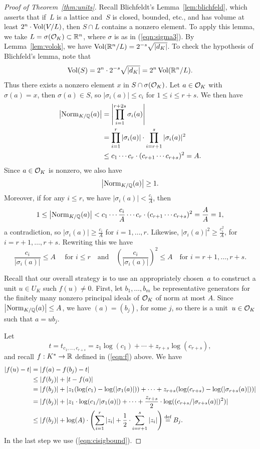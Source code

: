\begin{proof}[Proof of Theorem~\ref{thm:units}]
Recall Blichfeldt's Lemma~\ref{lem:blichfeld}, which asserts
that if~$L$ is a lattice and~$S$ is closed,
bounded, etc., and has volume at least $2^n\cdot \operatorname{Vol}(V/L)$, then
$S\cap L$ contains a nonzero element.   To apply this lemma, we
take $L=\sigma(\mathcal{O}_K)\subset \mathbb{R}^n$, where $\sigma$ is as in (\ref{eqn:sigma3}).
By Lemma~\ref{lem:volok},
we have
$\operatorname{Vol}(\mathbb{R}^n/L) = 2^{-s}\sqrt{|d_K|}$.  To check the hypothesis
of Blichfeld's lemma, note that
$$
 \operatorname{Vol}(S) = 2^n \cdot 2^{-s} \sqrt{|d_K|} = 2^n \operatorname{Vol}(\mathbb{R}^n/L).
$$
Thus there exists a nonzero element $x$ in $S\cap \sigma(\mathcal{O}_K)$.
Let $a\in \mathcal{O}_K$ with $\sigma(a)=x$, then $\sigma(a)\in S$, so
$|\sigma_i(a)|\leq c_i$ for $1\leq i\leq r+s$.
We then have
\begin{align*}
  \left|\operatorname{Norm}_{K/\mathbb{Q}}(a)\right| &=
   \left|\prod_{i=1}^{r+2s} \sigma_i(a)\right|\\
   &=  \prod_{i=1}^r |\sigma_i(a)|\cdot \prod_{i=r+1}^s|\sigma_i(a)|^2\\
   &\leq c_1\cdots c_r\cdot (c_{r+1}\cdots c_{r+s})^2 = A.
\end{align*}
Since $a\in \mathcal{O}_K$ is nonzero, we also have
$$
 \left|\operatorname{Norm}_{K/\mathbb{Q}}(a)\right|\geq 1.
$$
Moreover, if for any $i\leq r$, we have $|\sigma_i(a)|< \frac{c_i}{A}$, then
$$
 1\leq \left|\operatorname{Norm}_{K/\mathbb{Q}}(a)\right| < c_1\cdots \frac{c_i}{A}\cdots c_r \cdot (c_{r+1}\cdots c_{r+s})^2 = \frac{A}{A} = 1,
$$
a contradiction, so $|\sigma_i(a)|\geq \frac{c_i}{A}$ for $i=1,\ldots, r$. Likewise,
$|\sigma_i(a)|^2 \geq \frac{c_i^2}{A}$, for $i=r+1,\ldots, r+s$.
Rewriting this
we have
\begin{equation}\label{eqn:cisigbound}
  \frac{c_i}{|\sigma_i(a)|}\leq A\quad\text{ for }i\leq r\quad\text{and}\quad
\left(\frac{c_i}{|\sigma_i(a)|}\right)^2\leq A\quad\text{for } i=r+1,\ldots, r+s.
\end{equation}

Recall that our overall strategy is to use an appropriately chosen~$a$
to construct a unit $u\in U_K$ such $f(u)\neq 0$.  First, let
$b_1,\ldots, b_m$ be representative generators for the finitely many
nonzero principal ideals of $\mathcal{O}_K$ of norm at most $A$.  Since
$\left|\operatorname{Norm}_{K/\mathbb{Q}}(a)\right|\leq A$, we have $(a)=(b_j)$, for some $j$, so there
is a unit~$u\in \mathcal{O}_K$ such that $a=u b_j$.

Let
$$
t = t_{c_1,\ldots, c_{r+s}} = z_1\log(c_1)+\cdots +z_{r+s}\log(c_{r+s}),
$$
and recall $f:K^*\to \mathbb{R}$ defined in
(\ref{eqn:f}) above.
We have
\begin{align*}
  |f(u) - t| &= |f(a) - f(b_j) - t|\\
   &\leq |f(b_j)| + |t - f(a)|\\
   &=|f(b_j)| + |z_1(\log(c_1) - \log(|\sigma_1(a)|)) + \cdots + z_{r+s}(\log(c_{r+s}) - \log(|\sigma_{r+s}(a)|))|\\
   &=|f(b_j)| + |z_1\cdot \log(c_1/|\sigma_1(a)|) + \cdots + \frac{z_{r+s}}{2}\cdot \log((c_{r+s}/|\sigma_{r+s}(a)|)^2)|\\
   &\leq |f(b_j)| + \log(A)\cdot\left(\sum_{i=1}^{r}|z_i| + \frac{1}{2}\cdot \sum_{i=r+1}^s|z_i|\right) \defeq B_j.
\end{align*}
In the last step we use (\ref{eqn:cisigbound}).


\end{proof}
